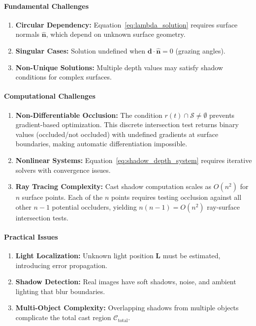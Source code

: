 \documentclass[12pt]{article}
\newcommand{\vect}[1]{\bm{#1}}
\theoremstyle{definition}
\begin{document}
\paragraph{Fundamental Challenges}
\begin{enumerate}[label=\arabic*.]
    \item \textbf{Circular Dependency:} Equation~\eqref{eq:lambda_solution} requires surface normals $\hat{\vect{n}}$, which depend on unknown surface geometry.
    
    \item \textbf{Singular Cases:} Solution undefined when $\vect{d} \cdot \hat{\vect{n}} = 0$ (grazing angles).
    
    \item \textbf{Non-Unique Solutions:} Multiple depth values may satisfy shadow conditions for complex surfaces.
\end{enumerate}

\paragraph{Computational Challenges}
\begin{enumerate}[label=\arabic*., resume]
    \item \textbf{Non-Differentiable Occlusion:} The condition $r(t) \cap \mathcal{S} \neq \emptyset$ prevents gradient-based optimization. This discrete intersection test returns binary values (occluded/not occluded) with undefined gradients at surface boundaries, making automatic differentiation impossible.
    
    \item \textbf{Nonlinear Systems:} Equation~\eqref{eq:shadow_depth_system} requires iterative solvers with convergence issues.
    
    \item \textbf{Ray Tracing Complexity:} Cast shadow computation scales as $O(n^2)$ for $n$ surface points. Each of the $n$ points requires testing occlusion against all other $n-1$ potential occluders, yielding $n(n-1) = O(n^2)$ ray-surface intersection tests.
\end{enumerate}

\paragraph{Practical Issues}
\begin{enumerate}[label=\arabic*., resume]
    \item \textbf{Light Localization:} Unknown light position $\vect{L}$ must be estimated, introducing error propagation.
    
    \item \textbf{Shadow Detection:} Real images have soft shadows, noise, and ambient lighting that blur boundaries.
    
    \item \textbf{Multi-Object Complexity:} Overlapping shadows from multiple objects complicate the total cast region $\mathcal{C}_{\text{total}}$.
\end{enumerate}
\end{document}
